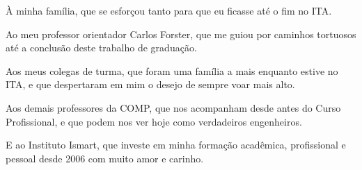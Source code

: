 À minha família, que se esforçou tanto para que eu ficasse até o fim no ITA.

Ao meu professor orientador Carlos Forster, que me guiou por caminhos tortuosos até a conclusão deste trabalho de graduação.

Aos meus colegas de turma, que foram uma família a mais enquanto estive no ITA, e que despertaram em mim o desejo de sempre voar mais alto.

Aos demais professores da COMP, que nos acompanham desde antes do Curso Profissional, e que podem nos ver hoje como verdadeiros engenheiros.

E ao Instituto Ismart, que investe em minha formação acadêmica, profissional e pessoal desde 2006 com muito amor e carinho.

\newpage